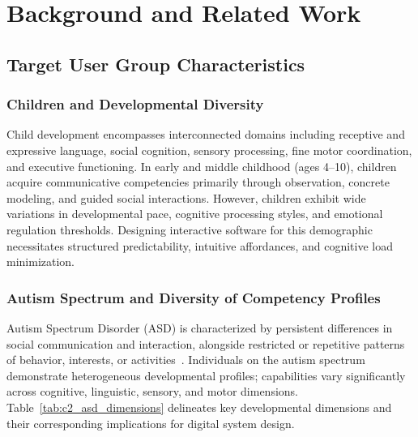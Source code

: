 \chapter{Background and Related Work}

\section{Target User Group Characteristics}

\subsection{Children and Developmental Diversity}

Child development encompasses interconnected domains including receptive and expressive language, social cognition, sensory processing, fine motor coordination, and executive functioning. In early and middle childhood (ages 4--10), children acquire communicative competencies primarily through observation, concrete modeling, and guided social interactions. However, children exhibit wide variations in developmental pace, cognitive processing styles, and emotional regulation thresholds. Designing interactive software for this demographic necessitates structured predictability, intuitive affordances, and cognitive load minimization.

\subsection{Autism Spectrum and Diversity of Competency Profiles}

Autism Spectrum Disorder (ASD) is characterized by persistent differences in social communication and interaction, alongside restricted or repetitive patterns of behavior, interests, or activities~\cite{cdc_diagnosis, nih_asd}. Individuals on the autism spectrum demonstrate heterogeneous developmental profiles; capabilities vary significantly across cognitive, linguistic, sensory, and motor dimensions. Table~\ref{tab:c2_asd_dimensions} delineates key developmental dimensions and their corresponding implications for digital system design.

